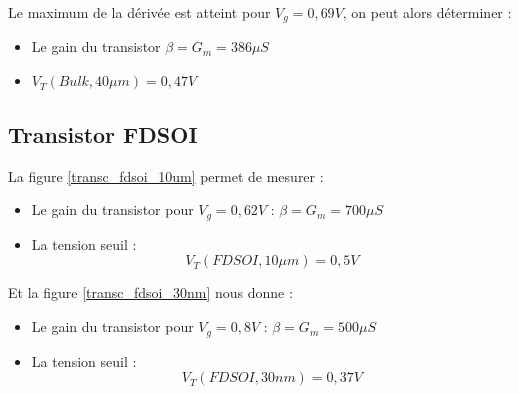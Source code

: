 \documentclass[a4paper,11pt]{report}
\begin{document}
Le maximum de la dérivée est atteint pour $V_g = 0,69V$, on peut alors déterminer :
\begin{itemize}
    \item Le gain du transistor $\beta = G_m = 386\mu S$
    \item $V_T(Bulk, 40\mu m) = 0,47V$
\end{itemize}



\subsection{Transistor FDSOI}
La figure \ref{transc_fdsoi_10um} permet de mesurer :
\begin{itemize}
    \item Le gain du transistor pour $V_g = 0,62V$ : $\beta = G_m = 700\mu S$
    \item La tension seuil : \[V_T(FDSOI, 10\mu m) = 0,5V\]
\end{itemize}

\vspace*{8mm}
Et la figure \ref{transc_fdsoi_30nm} nous donne :
\begin{itemize}
    \item Le gain du transistor pour $V_g = 0,8V$ : $\beta = G_m = 500\mu S$
    \item La tension seuil : \[V_T(FDSOI, 30nm) = 0,37V\]
\end{itemize}
\end{document}
